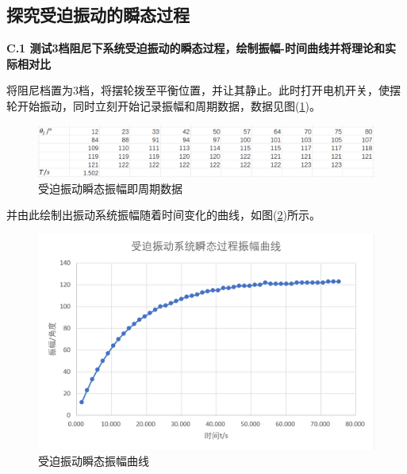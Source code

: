 \documentclass[a4paper,11pt]{article}
\begin{document}
    \subsection{探究受迫振动的瞬态过程}
        \textbf{C.1 测试3档阻尼下系统受迫振动的瞬态过程，绘制振幅-时间曲线并将理论和实际相对比}

        将阻尼档置为3档，将摆轮拨至平衡位置，并让其静止。此时打开电机开关，使摆轮开始振动，同时立刻开始记录振幅和周期数据，数据见图(\ref{fig: 受迫振动瞬态数据})。

        \begin{figure}[ht]
            \centering
            \includegraphics[scale=0.6]{受迫振动瞬态数据.png}
            \caption{受迫振动瞬态振幅即周期数据}
            \label{fig: 受迫振动瞬态数据}
        \end{figure}

        并由此绘制出振动系统振幅随着时间变化的曲线，如图(\ref{fig: 振幅曲线})所示。

        \begin{figure}[ht]
            \centering
            \includegraphics[scale=0.7]{受迫振动瞬态振幅曲线.png}
            \caption{受迫振动瞬态振幅曲线}
            \label{fig: 振幅曲线}
        \end{figure}
\end{document}
